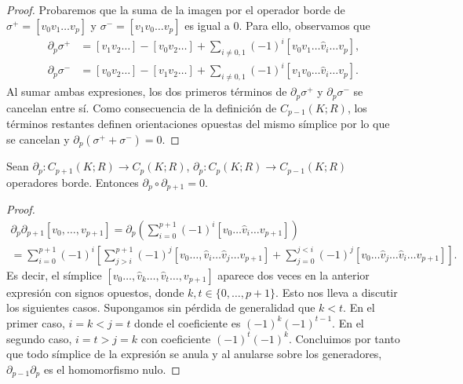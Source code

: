 \begin{proof}
	Probaremos que la suma de la imagen por el operador borde de $\sigma^{+}= [v_{0}
	v_{1}\ldots v_{p}]$ y $\sigma^{-}= [v_{1}v_{0}\ldots v_{p}]$ es igual a $0$.
	Para ello, observamos que
	\begin{align*}
		\partial_{p}\sigma^{+} & = [v_{1}v_{2}\ldots] - [v_{0}v_{2}\ldots] + \sum_{i\ne0,1}(-1)^{i}[v_{0}v_{1}\ldots \hat{v}_{i}\ldots v_{p}], \\
		\partial_{p}\sigma^{-} & = [v_{0}v_{2}\ldots] - [v_{1}v_{2}\ldots] + \sum_{i\ne0,1}(-1)^{i}[v_{1}v_{0}\ldots \hat{v}_{i}\ldots v_{p}].
	\end{align*}
	Al sumar ambas expresiones, los dos primeros términos de
	$\partial_{p}\sigma^{+}$ y $\partial_{p}\sigma^{-}$ se cancelan entre sí. Como
	consecuencia de la definición de $C_{p-1}(K;R)$, los términos restantes
	definen orientaciones opuestas del mismo símplice por lo que se cancelan y
	$\partial_{p}(\sigma^{+}+\sigma^{-})=0$.
\end{proof}

\begin{lema}
	Sean $\partial_{p}: C_{p+1}(K;R) \to C_{p}(K;R)$,
	$\partial_{p}: C_{p}(K;R) \to C_{p-1}(K;R)$ operadores borde. Entonces $\partial
	_{p}\circ \partial_{p+1}= 0$.
\end{lema}
\begin{proof}
	\begin{gather*}
		\partial_{p}\partial_{p+1}[v_{0}, \ldots, v_{p+1}] = \partial_{p}\left( \sum_{i=0}
		^{p+1}(-1)^{i}[v_{0}\ldots \hat{v}_{i}\ldots v_{p+1}] \right) \\ = \sum_{i=0}
		^{p+1}(-1)^{i}\left[ \sum_{j>i}^{p+1}(-1)^{j}[v_{0}\ldots, \hat{v}_{i}\ldots
		\hat{v}_{j}\ldots v_{p+1}] + \sum_{j=0}^{j<i}(-1)^{j}[v_{0}\ldots \hat{v}_{j}
		\ldots \hat{v}_{i}\ldots v_{p+1}] \right].
	\end{gather*}
	Es decir, el símplice
	$[v_{0}\ldots,\hat{v}_{k}\ldots,\hat{v}_{t}\ldots, v_{p+1}]$ aparece dos veces
	en la anterior expresión con signos opuestos, donde $k,t \in \{0, \ldots, p+1\}$.
	Esto nos lleva a discutir los siguientes casos. Supongamos sin pérdida de generalidad
	que $k < t$. En el primer caso, $i = k < j = t$ donde el coeficiente es $(-1)^{k}
	(-1)^{t-1}$. En el segundo caso, $i = t > j = k$ con coeficiente $(-1)^{t}(-1)^{k}$.
	Concluimos por tanto que todo símplice de la expresión se anula y al anularse
	sobre los generadores, $\partial_{p-1}\partial_{p}$ es el homomorfismo nulo.
\end{proof}

